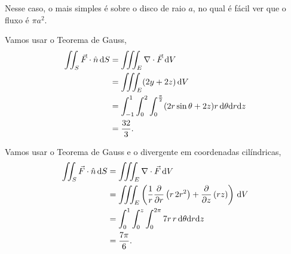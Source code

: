\begin{questions}
\begin{solution}
    Nesse caso, o mais simples é sobre o disco de raio $a$, no qual é fácil ver que o fluxo é $\pi a^2$.
\end{solution}


\begin{solution}
    Vamos usar o Teorema de Gauss,
    \begin{align*}
        \iint_S \vec F \cdot \hat n \, \mathrm{d} S 
            &= \iiint_E \nabla\cdot\vec F \,\mathrm{d} V \\
            &= \iiint_E (2y+2z)\,\mathrm{d} V \\
            &= \int_{-1}^1 \int_0^2 \int_0^{\frac{\pi}{2}} (2r\sin\theta+2z) r\, \mathrm{d}\theta \mathrm{d} r \mathrm{d} z \\
            &= \frac{32}{3}.
    \end{align*}
\end{solution}


\begin{solution}
    Vamos usar o Teorema de Gauss e o divergente em coordenadas cilíndricas,
    \begin{align*}
        \iint_S \vec F \cdot \hat n \, \mathrm{d} S 
            &= \iiint_E \nabla\cdot\vec F \,\mathrm{d} V \\
            &= \iiint_E \left( \frac{1}{r} \frac{\partial}{\partial r}\left(r\,2r^2\right) + \frac{\partial}{\partial z}\left( rz \right) \right)\,\mathrm{d} V \\
            &= \int_{0}^1 \int_0^z \int_0^{2\pi} 7r\, r\,\mathrm{d}\theta \mathrm{d} r \mathrm{d} z \\
            &= \frac{7 \pi}{6}.
    \end{align*}
\end{solution}

\end{questions}
